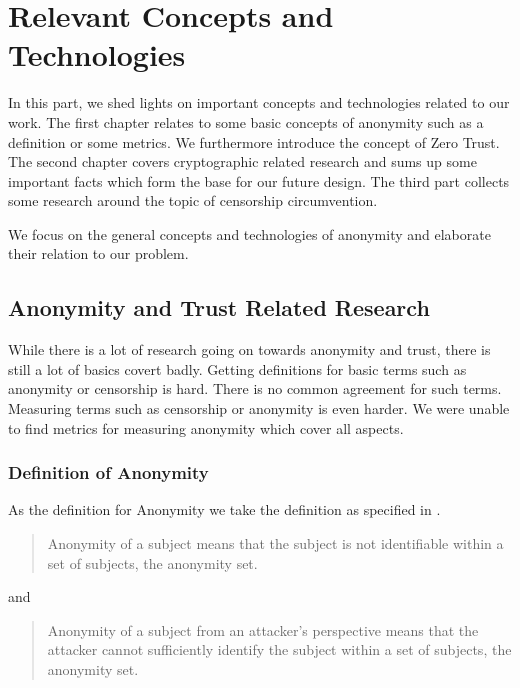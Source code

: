 

\part{Relevant Concepts and Technologies}\label{sec:concepts}
In this part, we shed lights on important concepts and technologies related to our work. The first chapter relates to some basic concepts of anonymity such as a definition or some metrics. We furthermore introduce the concept of Zero Trust. The second chapter covers cryptographic related research and sums up some important facts which form the base for our future design. The third part collects some research around the topic of censorship circumvention.

We focus on the general concepts and technologies of anonymity and elaborate their relation to our problem.

\chapter{Anonymity and Trust Related Research}
While there is a lot of research going on towards anonymity and trust, there is still a lot of basics covert badly. Getting definitions for basic terms such as anonymity or censorship is hard. There is no common agreement for such terms. Measuring terms such as censorship or anonymity is even harder. We were unable to find metrics for measuring anonymity which cover all aspects.

\section{Definition of Anonymity}
As the definition for Anonymity we take the definition as specified in \cite{anonTerminology}.
\begin{quote}
	Anonymity of a subject means that the subject is not identifiable within a set of subjects, the anonymity set.\omitted
\end{quote}
and
\begin{quote}
	Anonymity of a subject from an attacker's perspective means that the attacker cannot sufficiently identify the subject within a set of subjects, the anonymity set.\omitted
\end{quote}

